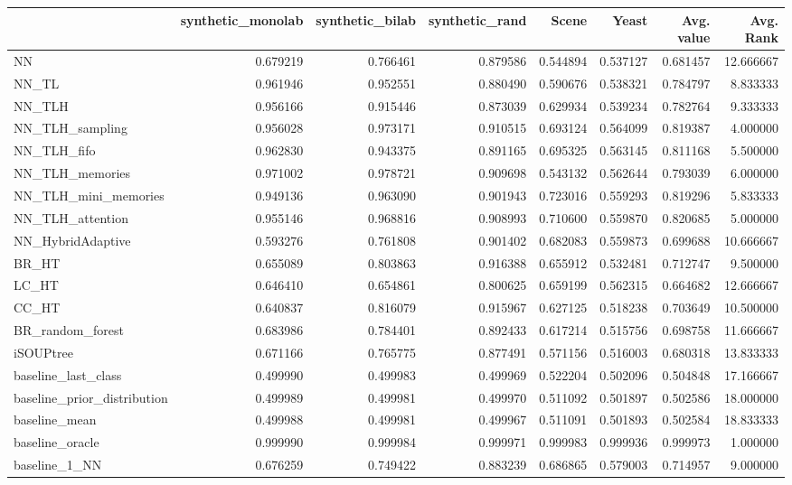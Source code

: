 \begin{tabular}{lrrrrrrr}
\toprule
 & synthetic_monolab & synthetic_bilab & synthetic_rand & Scene & Yeast & Avg. value & Avg. Rank \\
\midrule
NN & 0.679219 & 0.766461 & 0.879586 & 0.544894 & 0.537127 & 0.681457 & 12.666667 \\
NN_TL & 0.961946 & 0.952551 & 0.880490 & 0.590676 & 0.538321 & 0.784797 & 8.833333 \\
NN_TLH & 0.956166 & 0.915446 & 0.873039 & 0.629934 & 0.539234 & 0.782764 & 9.333333 \\
NN_TLH_sampling & 0.956028 & 0.973171 & 0.910515 & 0.693124 & 0.564099 & 0.819387 & 4.000000 \\
NN_TLH_fifo & 0.962830 & 0.943375 & 0.891165 & 0.695325 & 0.563145 & 0.811168 & 5.500000 \\
NN_TLH_memories & 0.971002 & 0.978721 & 0.909698 & 0.543132 & 0.562644 & 0.793039 & 6.000000 \\
NN_TLH_mini_memories & 0.949136 & 0.963090 & 0.901943 & 0.723016 & 0.559293 & 0.819296 & 5.833333 \\
NN_TLH_attention & 0.955146 & 0.968816 & 0.908993 & 0.710600 & 0.559870 & 0.820685 & 5.000000 \\
NN_HybridAdaptive & 0.593276 & 0.761808 & 0.901402 & 0.682083 & 0.559873 & 0.699688 & 10.666667 \\
BR_HT & 0.655089 & 0.803863 & 0.916388 & 0.655912 & 0.532481 & 0.712747 & 9.500000 \\
LC_HT & 0.646410 & 0.654861 & 0.800625 & 0.659199 & 0.562315 & 0.664682 & 12.666667 \\
CC_HT & 0.640837 & 0.816079 & 0.915967 & 0.627125 & 0.518238 & 0.703649 & 10.500000 \\
BR_random_forest & 0.683986 & 0.784401 & 0.892433 & 0.617214 & 0.515756 & 0.698758 & 11.666667 \\
iSOUPtree & 0.671166 & 0.765775 & 0.877491 & 0.571156 & 0.516003 & 0.680318 & 13.833333 \\
baseline_last_class & 0.499990 & 0.499983 & 0.499969 & 0.522204 & 0.502096 & 0.504848 & 17.166667 \\
baseline_prior_distribution & 0.499989 & 0.499981 & 0.499970 & 0.511092 & 0.501897 & 0.502586 & 18.000000 \\
baseline_mean & 0.499988 & 0.499981 & 0.499967 & 0.511091 & 0.501893 & 0.502584 & 18.833333 \\
baseline_oracle & 0.999990 & 0.999984 & 0.999971 & 0.999983 & 0.999936 & 0.999973 & 1.000000 \\
baseline_1_NN & 0.676259 & 0.749422 & 0.883239 & 0.686865 & 0.579003 & 0.714957 & 9.000000 \\
\bottomrule
\end{tabular}
